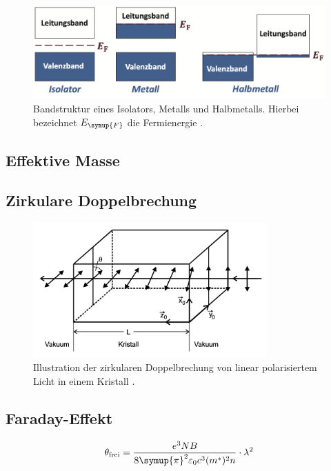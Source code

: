 \begin{figure}
    \centering
    \includegraphics[width=\textwidth]{content/pics/Bandstruktur.png}
    \caption{Bandstruktur eines Isolators, Metalls und Halbmetalls. Hierbei bezeichnet $E_{\symup{F}}$ die Fermienergie \cite{GrossMarx2018}.}
    \label{fig:Bandstruktur}
\end{figure}

\subsection{Effektive Masse}
\label{subsec:Effektive Masse}

\subsection{Zirkulare Doppelbrechung}
\label{subsec:Zirkulare Doppelbrechung}

\begin{figure}
    \centering
    \includegraphics[width=0.8\textwidth]{content/pics/Zirkulare_Doppelbrechung.png}
    \caption{Illustration der zirkularen Doppelbrechung von linear polarisiertem Licht in einem Kristall \cite{V46_Anhang}.}
    \label{fig:Zirkulare Doppelbrechung}
\end{figure}

\subsection{Faraday-Effekt}
\label{subsec:Faraday-Effekt}


\begin{equation}
    \label{eqn:theta_l2}
    \theta_\text{frei} = \frac{e^3 N B}{8\symup{\pi}^2 \varepsilon_0 c^3 (m^*)^2 n} \cdot \lambda^2 
\end{equation}

